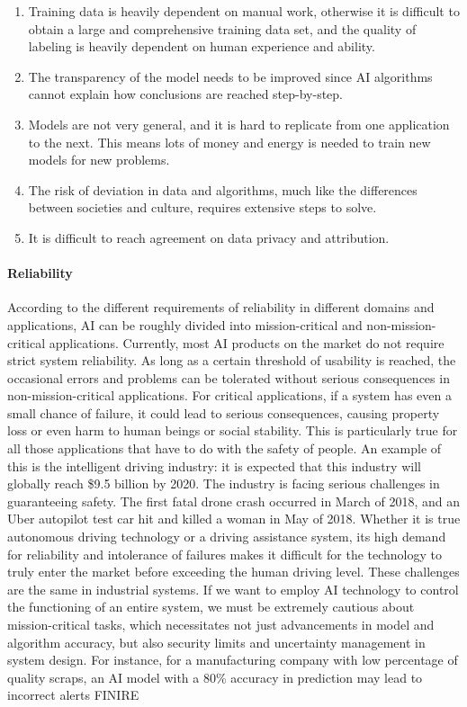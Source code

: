 \begin{enumerate}
    \item Training data is heavily dependent on manual work, otherwise it is difficult to obtain a large and comprehensive training data set, and the quality of labeling is heavily dependent on human experience and ability.
    \item The transparency of the model needs
    to be improved since AI algorithms cannot explain how conclusions are reached step-by-step.
    \item Models are not very general, and it is hard to replicate from one application to the next. This means lots of money and energy is needed to train new models for new problems.
    \item The risk of deviation in data and algorithms, much
    like the differences between societies and culture, requires extensive steps to solve.
    \item It is difficult to reach agreement on data privacy and attribution.
\end{enumerate}

\paragraph{Reliability}


According to the different requirements of reliability in different domains and applications, AI can be roughly divided into mission-critical and non-mission-critical applications. Currently, most AI products on the market do not require strict system reliability. As long as a certain threshold of usability is reached, the occasional errors and problems can be tolerated without serious consequences in non-mission-critical applications. For critical applications, if a system has even a small chance of failure, it could lead to serious consequences, causing property loss or even harm to human beings or social stability. This is particularly true for all those applications that have to do with the safety of people. An example of this is the intelligent driving industry: it is expected
that this industry will globally reach \$9.5 billion by 2020. The industry is facing serious challenges in guaranteeing safety. The first fatal drone crash occurred in March of 2018, and an Uber autopilot test car hit and killed a woman in May of 2018. Whether it is true autonomous driving technology or a driving assistance system, its high demand for reliability and intolerance of failures makes it difficult for the technology to truly enter the market before exceeding the human driving level. These challenges are the same in industrial systems. If we want to employ AI technology to control the functioning of an entire system, we must be extremely cautious about mission-critical tasks, which necessitates not just advancements in model and algorithm accuracy, but also security limits and uncertainty management in system design. For instance, for a manufacturing company with low percentage of quality scraps, an AI model with a 80\% accuracy in prediction may lead to incorrect alerts FINIRE 


